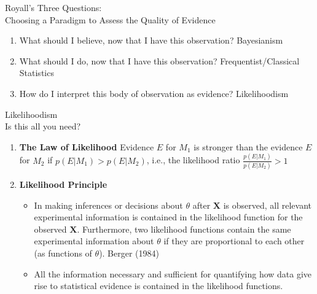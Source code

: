 \documentclass{beamer}
\begin{document}
\begin{frame}{Royall's Three Questions: \\
 Choosing a Paradigm to Assess the Quality of Evidence}
	\begin{enumerate}
		\item What should I believe, now that I have this observation? \alert{Bayesianism}
\vfill
		\item What should I do, now that I have this observation? \alert{Frequentist/Classical Statistics}
\vfill
		\item How do I interpret this body of observation as evidence? \alert{Likelihoodism}
	\end{enumerate}
\end{frame}

	\begin{frame}{Likelihoodism\\ Is this all you need?}
        \begin{enumerate}
        \item \textbf{The Law of Likelihood}
        \vfill
        Evidence $E$ for $M_{1}$ is stronger than the evidence $E$ for $M_{2}$ if $p(E| M_{1}) > p(E | M_{2})$, i.e., the likelihood ratio $\frac{p(E|M_{1})}{p(E|M_{2})}>1$
        
        \vfill
        
        \item \textbf{Likelihood Principle}
        \vfill
\begin{itemize}
\item  In making inferences or decisions about $\theta$ after $\boldsymbol{X}$ is observed, all relevant experimental information is contained in the likelihood function for the observed $\boldsymbol{X}$. Furthermore, two likelihood functions contain the same experimental information about $\theta$ if they are proportional to each other (as functions
of $\theta$). Berger (1984)
\vfill
\item All the information necessary and sufficient for quantifying how data give rise to statistical evidence is contained in the likelihood functions.
\end{itemize}
        \end{enumerate}
	\end{frame}
    
\end{document}
